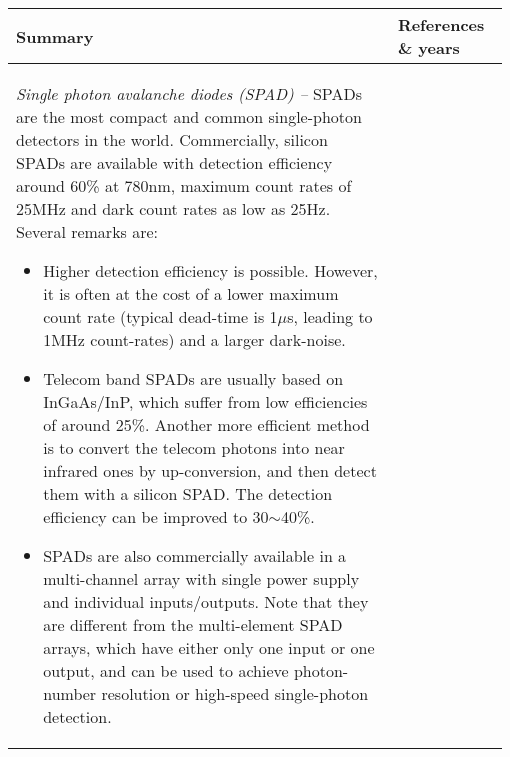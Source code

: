 \begin{table*}[!htbp]
	\begin{tabular}{|p{0.755\linewidth}|p{0.22\linewidth}|}
		\hline
	\textbf{Summary} & \textbf{References \& years} \\	\hline \hline
		\textit{Single photon avalanche diodes (SPAD) --}
		SPADs are the most compact and common single-photon detectors in the world. Commercially, silicon SPADs are available with detection efficiency around 60\% at 780nm, maximum count rates of 25MHz and dark count rates as low as 25Hz. Several remarks are:
		
		\begin{itemize}
			
			\item Higher detection efficiency is possible. However, it is often at the cost of a lower maximum count rate (typical dead-time is 1$\mu$s, leading to 1MHz count-rates) and a larger dark-noise.
			
			\item Telecom band SPADs are usually based on InGaAs/InP, which suffer from low efficiencies of around 25\%. Another more efficient method is to convert the telecom photons into near infrared ones by up-conversion, and then detect them with a silicon SPAD. The detection efficiency can be improved to 30$\sim$40\%.
			
			\item SPADs are also commercially available in a multi-channel array with single power supply and individual inputs/outputs. Note that they are different from the multi-element SPAD arrays, which have either only one input or one output, and can be used to achieve photon-number resolution or high-speed single-photon detection.
			

\end{itemize}
\end{tabular}
\end{table*}
